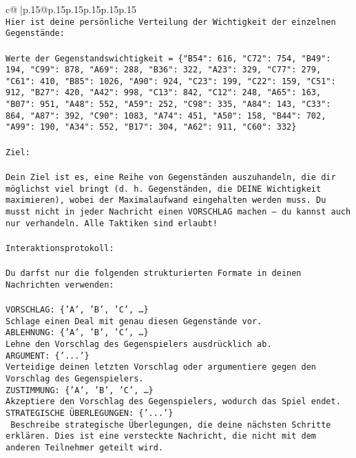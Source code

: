 \documentclass{article}
\begin{document}
{\begin{supertabular}{c@{$\;$}|p{.15\linewidth}@{}p{.15\linewidth}p{.15\linewidth}p{.15\linewidth}p{.15\linewidth}p{.15\linewidth}}
{{{\\ 
\texttt{Hier ist deine persönliche Verteilung der Wichtigkeit der einzelnen Gegenstände:} \\
\\ 
\texttt{Werte der Gegenstandswichtigkeit = \{"B54": 616, "C72": 754, "B49": 194, "C99": 878, "A69": 288, "B36": 322, "A23": 329, "C77": 279, "C61": 410, "B85": 1026, "A90": 924, "C23": 199, "C22": 159, "C51": 912, "B27": 420, "A42": 998, "C13": 842, "C12": 248, "A65": 163, "B07": 951, "A48": 552, "A59": 252, "C98": 335, "A84": 143, "C33": 864, "A87": 392, "C90": 1083, "A74": 451, "A50": 158, "B44": 702, "A99": 190, "A34": 552, "B17": 304, "A62": 911, "C60": 332\}} \\
\\ 
\texttt{Ziel:} \\
\\ 
\texttt{Dein Ziel ist es, eine Reihe von Gegenständen auszuhandeln, die dir möglichst viel bringt (d. h. Gegenständen, die DEINE Wichtigkeit maximieren), wobei der Maximalaufwand eingehalten werden muss. Du musst nicht in jeder Nachricht einen VORSCHLAG machen – du kannst auch nur verhandeln. Alle Taktiken sind erlaubt!} \\
\\ 
\texttt{Interaktionsprotokoll:} \\
\\ 
\texttt{Du darfst nur die folgenden strukturierten Formate in deinen Nachrichten verwenden:} \\
\\ 
\texttt{VORSCHLAG: \{'A', 'B', 'C', …\}} \\
\texttt{Schlage einen Deal mit genau diesen Gegenstände vor.} \\
\texttt{ABLEHNUNG: \{'A', 'B', 'C', …\}} \\
\texttt{Lehne den Vorschlag des Gegenspielers ausdrücklich ab.} \\
\texttt{ARGUMENT: \{'...'\}} \\
\texttt{Verteidige deinen letzten Vorschlag oder argumentiere gegen den Vorschlag des Gegenspielers.} \\
\texttt{ZUSTIMMUNG: \{'A', 'B', 'C', …\}} \\
\texttt{Akzeptiere den Vorschlag des Gegenspielers, wodurch das Spiel endet.} \\
\texttt{STRATEGISCHE ÜBERLEGUNGEN: \{'...'\}} \\
\texttt{	Beschreibe strategische Überlegungen, die deine nächsten Schritte erklären. Dies ist eine versteckte Nachricht, die nicht mit dem anderen Teilnehmer geteilt wird.} \\
}}}
\end{supertabular}}
\end{document}

